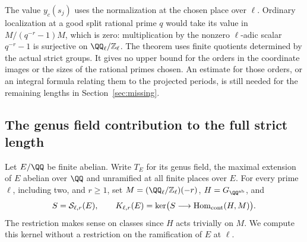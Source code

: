 \documentclass[a4paper,11pt]{article}
\theoremstyle{definition}
\theoremstyle{remark}
\newcommand{\ZZ}{\mathbb Z}\newcommand{\ord}{\operatorname{ord}}
\numberwithin{equation}{section}
\begin{document}
The value \(y_c(s_j)\) uses the normalization at the
chosen place over \(\ell\). Ordinary localization at a
good split rational prime \(q\) would take its value in
\(M/(q^{-r}-1)M\), which is zero: multiplication by the
nonzero \(\ell\)-adic scalar \(q^{-r}-1\) is surjective
on \(\QQ_\ell/\ZZ_\ell\). The theorem uses finite
quotients determined by the actual strict groups. It
gives no upper bound for the orders in the coordinate
images or the sizes of the rational primes chosen.
An estimate for those orders, or an integral formula
relating them to the projected periods, is still needed
for the remaining lengths in Section~\ref{sec:missing}.


\subsection{The genus field contribution to the full strict length}
\label{sec:genusstrict601}

Let \(E/\QQ\) be finite abelian. Write \(T_E\) for its
genus field, the maximal extension of \(E\) abelian over
\(\QQ\) and unramified at all finite places over \(E\).
For every prime \(\ell\), including two, and \(r\ge1\), set
\(M=(\QQ_\ell/\ZZ_\ell)(-r)\), \(H=G_{\QQ^{\rm ab}}\), and
\[
 S=\mathcal S_{\ell,r}(E),\qquad
 K_{\ell,r}(E)=
 \ker\bigl(S\longrightarrow\operatorname{Hom}_{\rm cont}(H,M)\bigr).
\]
The restriction makes sense on classes since \(H\) acts
trivially on \(M\). We compute this kernel without a
restriction on the ramification of \(E\) at \(\ell\).
\end{document}
